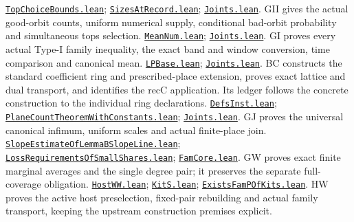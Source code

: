 \documentclass[11pt,a4paper]{article}
\numberwithin{equation}{section}
\theoremstyle{remark}\newtheorem{remark}[theorem]{Remark}
\newcommand{\src}[2]{\href{https://github.com/CocoSgt/riemann-hypothesis-lean/blob/7cbf7a0c32fca1badf05931879a37c3f8a2b03b4/src/#1}{\texttt{#2}}}
\begin{document}
\begin{thebibliography}{99}
 \src{Formalism/SharpRestriction/GrowthBounds/TopChoiceBounds.lean}{TopChoiceBounds.lean}; \src{Formalism/SharpRestriction/GrowthBounds/SizesAtRecord.lean}{SizesAtRecord.lean}; \src{Formalism/SharpRestriction/GrowthBounds/Joints.lean}{Joints.lean}. GII gives the actual good-orbit counts, uniform numerical supply, conditional bad-orbit probability and simultaneous tops selection.
 \src{Formalism/SharpRestriction/GrowthBounds/LogarithmicSums/MeanNum.lean}{MeanNum.lean}; \src{Formalism/SharpRestriction/GrowthBounds/Joints.lean}{Joints.lean}. GI proves every actual Type-I family inequality, the exact band and window conversion, time comparison and canonical mean.
 \src{Formalism/LocalToGlobal/GroupLattices/FockModels/LPBase.lean}{LPBase.lean}; \src{Formalism/SharpRestriction/GrowthBounds/Joints.lean}{Joints.lean}. BC constructs the standard coefficient ring and prescribed-place extension, proves exact lattice and dual transport, and identifies the recC application. Its ledger follows the concrete construction to the individual ring declarations.
 \src{Formalism/SharpRestriction/GrowthBounds/DefsInst.lean}{DefsInst.lean}; \src{Formalism/SharpRestriction/GrowthBounds/PlaneCountTheoremWithConstants.lean}{PlaneCountTheoremWithConstants.lean}; \src{Formalism/SharpRestriction/GrowthBounds/Joints.lean}{Joints.lean}. GJ proves the universal canonical infimum, uniform scales and actual finite-place join.
 \src{Formalism/SharpRestriction/GrowthBounds/LogarithmicSums/SlopeEstimateOfLemmaBSlopeLine.lean}{SlopeEstimateOfLemmaBSlopeLine.lean}; \src{Formalism/LocalToGlobal/GlobalTheory/LossRequirementsOfSmallShares.lean}{LossRequirementsOfSmallShares.lean}; \src{Formalism/SharpRestriction/FamCore.lean}{FamCore.lean}. GW proves exact finite marginal averages and the single degree pair; it preserves the separate full-coverage obligation.
 \src{Development/AutomorphicArithmetic/CharacterBoxes/HostWW.lean}{HostWW.lean}; \src{Development/AutomorphicArithmetic/CharacterBoxes/KitS.lean}{KitS.lean}; \src{Development/AbelianVarietyTheory/Proofs/GlobalInterpolation/ExistsFamPOfKits.lean}{ExistsFamPOfKits.lean}. HW proves the active host preselection, fixed-pair rebuilding and actual family transport, keeping the upstream construction premises explicit.



\end{thebibliography}
\end{document}
